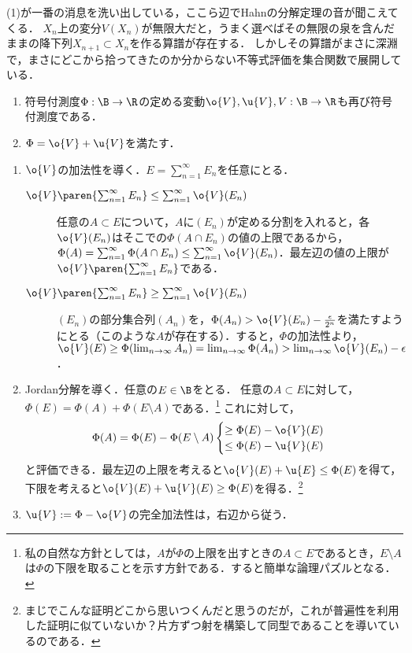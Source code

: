 \documentclass[uplatex, dvipdfmx]{jsreport}
\begin{document}
\begin{remarks}[有界な符号付測度の全変動は有界である]
    (1)が一番の消息を洗い出している，ここら辺でHahnの分解定理の音が聞こえてくる．
    $X_n$上の変分$V(X_n)$が無限大だと，うまく選べばその無限の泉を含んだままの降下列$X_{n+1}\subset X_n$を作る算譜が存在する．
    しかしその算譜がまさに深淵で，まさにどこから拾ってきたのか分からない不等式評価を集合関数で展開している．
\end{remarks}

\begin{theorem}\mbox{}\label{thm-Jordan-decomposition}
    \begin{enumerate}
        \item 符号付測度$\Phi:\B\to\R$の定める変動$\o{V},\u{V},V:\B\to\R$も再び符号付測度である．
        \item $\Phi=\o{V}+\u{V}$を満たす．
    \end{enumerate}
\end{theorem}
\begin{Proof}\mbox{}
    \begin{enumerate}
        \item $\o{V}$の加法性を導く．$E=\sum^\infty_{n=1}E_n$を任意にとる．
        \begin{description}
            \item[$\o{V}\paren{\sum^\infty_{n=1}E_n}\le\sum^\infty_{n=1}\o{V}(E_n)$] 任意の$A\subset E$について，$A$に$(E_n)$が定める分割を入れると，各$\o{V}(E_n)$はそこでの$\Phi(A\cap E_n)$の値の上限であるから，$\Phi(A)=\sum^\infty_{n=1}\Phi(A\cap E_n)\le\sum^\infty_{n=1}\o{V}(E_n)$．最左辺の値の上限が$\o{V}\paren{\sum^\infty_{n=1}E_n}$である．
            \item[$\o{V}\paren{\sum^\infty_{n=1}E_n}\ge\sum^\infty_{n=1}\o{V}(E_n)$] $(E_n)$の部分集合列$(A_n)$を，$\Phi(A_n)>\o{V}(E_n)-\frac{\epsilon}{2^n}$を満たすようにとる（このような$A$が存在する）．すると，$\Phi$の加法性より，$\o{V}(E)\ge\Phi(\lim_{n\to\infty}A_n)=\lim_{n\to\infty}\Phi(A_n)>\lim_{n\to\infty}\o{V}(E_n)-\epsilon$．
        \end{description}
        \item Jordan分解を導く．任意の$E\in\B$をとる．
        任意の$A\subset E$に対して，$\Phi(E)=\Phi(A)+\Phi(E\setminus A)$である．\footnote{私の自然な方針としては，$A$が$\Phi$の上限を出すときの$A\subset E$であるとき，$E\setminus A$は$\Phi$の下限を取ることを示す方針である．すると簡単な論理パズルとなる．}
        これに対して，
        \[\Phi(A)=\Phi(E)-\Phi(E\setminus A)\begin{cases}
            \ge\Phi(E)-\o{V}(E)\\
            \le\Phi(E)-\u{V}(E)
        \end{cases}\]
        と評価できる．最左辺の上限を考えると$\o{V}(E)+\u{E}\le\Phi(E)$を得て，下限を考えると$\o{V}(E)+\u{V}(E)\ge\Phi(E)$を得る．\footnote{まじでこんな証明どこから思いつくんだと思うのだが，これが普遍性を利用した証明に似ていないか？片方ずつ射を構築して同型であることを導いているのである．}
        \item $\u{V}:=\Phi-\o{V}$の完全加法性は，右辺から従う．
    \end{enumerate}
\end{Proof}
\end{document}
